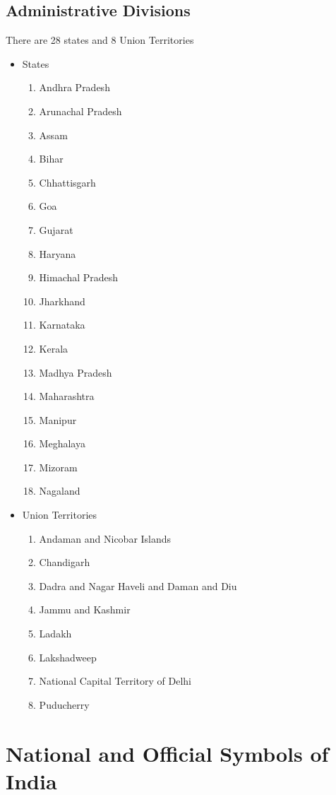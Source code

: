 \documentclass[12pt,a4paper]{article}
\begin{document}
\subsection{Administrative Divisions}
There are 28 states and 8 Union Territories
\begin{itemize}
	\item States
	\begin{enumerate}
		\item Andhra Pradesh
		\item Arunachal Pradesh
		\item Assam
		\item Bihar
		\item Chhattisgarh
		\item Goa
		\item Gujarat
		\item Haryana
		\item Himachal Pradesh
		\item Jharkhand
		\item Karnataka
		\item Kerala
		\item Madhya Pradesh
		\item Maharashtra
		\item Manipur
		\item Meghalaya
		\item Mizoram
		\item Nagaland	
	\end{enumerate}
	\item Union Territories
	\begin{enumerate}[label= (\Alph*)]
		\item Andaman and Nicobar Islands
		\item Chandigarh
		\item Dadra and Nagar Haveli and Daman and Diu
		\item Jammu and Kashmir
		\item Ladakh
		\item Lakshadweep
		\item National Capital Territory of Delhi
		\item Puducherry
	\end{enumerate}
\end{itemize}

\newpage
\section{National and Official Symbols of India}
\end{document}
